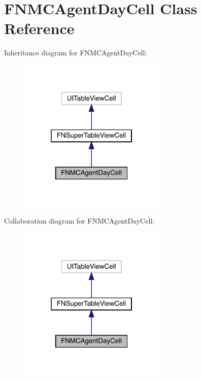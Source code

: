 \hypertarget{interface_f_n_m_c_agent_day_cell}{}\section{F\+N\+M\+C\+Agent\+Day\+Cell Class Reference}
\label{interface_f_n_m_c_agent_day_cell}


Inheritance diagram for F\+N\+M\+C\+Agent\+Day\+Cell\+:\nopagebreak
\begin{figure}[H]
\begin{center}
\leavevmode
\includegraphics[width=199pt]{interface_f_n_m_c_agent_day_cell__inherit__graph}
\end{center}
\end{figure}


Collaboration diagram for F\+N\+M\+C\+Agent\+Day\+Cell\+:\nopagebreak
\begin{figure}[H]
\begin{center}
\leavevmode
\includegraphics[width=199pt]{interface_f_n_m_c_agent_day_cell__coll__graph}
\end{center}
\end{figure}
